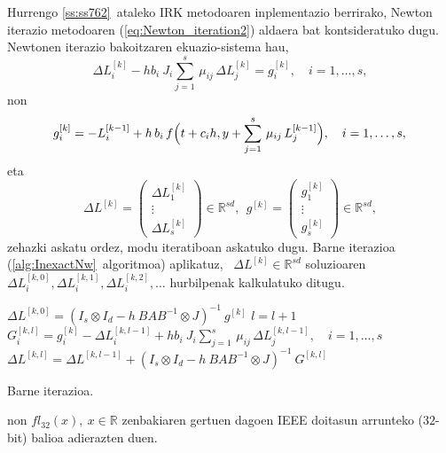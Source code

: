 Hurrengo  \ref{ss:ss762}~ataleko IRK metodoaren inplementazio berrirako, Newton iterazio metodoaren (\ref{eq:Newton_iteration2}) aldaera bat kontsideratuko dugu. Newtonen iterazio bakoitzaren ekuazio-sistema hau, 
\begin{equation}
\label{eq:linsysZ}
 \Delta L_{i}^{[k]}  - h b_i \ J_i \sum_{j=1}^{s}\, \mu_{ij} \, \Delta L_{j}^{[k]} = g_i^{[k]}, \quad  i=1 ,\ldots, s, 
\end{equation}
non
\begin{equation}
\label{eq:gk}
g_i^{[k]} = -L_{i}^{[k-1]}  + h \, b_i\, f\Big(t+c_i h,  y+\sum_{j=1}^{s}\, \mu_{ij}\, L_{j}^{[k-1]}\Big), \quad  i=1 ,\ldots, s, \\
\end{equation}
eta
\begin{equation*}
\Delta L^{[k]}= \left(
\begin{matrix}
\Delta L_1^{[k]}\\
\vdots\\
\Delta L_s^{[k]}
\end{matrix}
\right) \in \mathbb{R}^{sd}, \ \
g^{[k]}= \left(
\begin{matrix}
g_1^{[k]} \\
\vdots\\
g_s^{[k]}
\end{matrix}
\right) \in \mathbb{R}^{sd},
\end{equation*}
%
zehazki askatu ordez, modu iteratiboan askatuko dugu. Barne iterazioa (\ref{alg:InexactNw}~algoritmoa) aplikatuz, ~$\Delta L^{[k]} \in \mathbb{R}^{sd}$ soluzioaren  $ \Delta L_{i}^{[k,0]},  \Delta L_{i}^{[k,1]},  \Delta L_{i}^{[k,2]}, \ldots$ hurbilpenak kalkulatuko ditugu. 

\begin{algorithm}[H]
  $ \Delta L^{[k,0]} = (I_s \otimes I_d - h \ BAB^{-1} \otimes J)^{-1} \ g^{[k]}$\;
  \BlankLine
  {
   \BlankLine
   $l=l+1$\;
   $G_i^{[k,l]} = g_i^{[k]} - \Delta L_{i}^{[k,l-1]}  + h b_i \ J_i \sum_{j=1}^{s}\, \mu_{ij} \, \Delta L_{j}^{[k,l-1]},  \quad  i=1 ,\ldots, s$\;
   \BlankLine
   $\Delta L^{[k,l]}=\Delta L^{[k,l-1]}+ (I_s \otimes I_d - h \ BAB^{-1} \otimes J)^{-1} \ G^{[k,l]}$\;
  }
 \caption{Barne iterazioa.}
 \label{alg:InexactNw}
\end{algorithm}

non $fl_{32}(x), \ x \in \mathbb{R}$ zenbakiaren gertuen dagoen IEEE doitasun arrunteko ($32$-bit) balioa adierazten duen.


